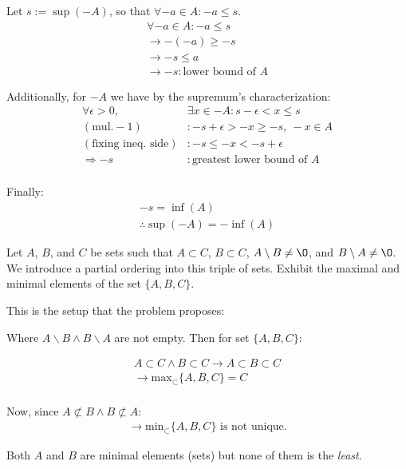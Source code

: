 \begin{solution}
Let $s := \sup{(-A)}$, so that $\forall -a \in A: -a \leq s$.
\begin{align*}
\forall -a \in A: -a \leq s \\
\rightarrow -(-a) \geq -s \\
\rightarrow -s \leq a \\
\rightarrow -s : \text{lower bound of } A
\end{align*}

Additionally, for $-A$ we have by the supremum's characterization:
\begin{align*}
\forall \epsilon > 0, &\exists x \in -A: s - \epsilon < x \leq s\\
(\text{mul.} -1)&: -s + \epsilon > -x \geq -s, \ -x \in A\\
(\text{fixing ineq. side})&: -s \leq -x < -s + \epsilon \\
\Rightarrow -s&: \text{greatest lower bound of } A \\
\end{align*}

Finally:
\begin{align*}
-s = \inf(A) \\
\therefore \sup(-A) = -\inf(A)
\end{align*}

\end{solution}

\begin{problem}
Let $A$, $B$, and $C$ be sets such that $A \subset C$, $B \subset C$, $A \setminus B \neq \O$, and $B \setminus A \neq \O$. We introduce a partial ordering into this triple of sets. Exhibit the maximal and minimal elements of the set $\{A,B,C\}$.
\end{problem}

\begin{solution}
This is the setup that the problem proposes:

Where $A \backslash B \land B \backslash A$ are not empty. Then for set $\{A, B, C\}$:

\begin{align*}
A \subset C \land B \subset C \rightarrow A \subset B \subset C \\
\rightarrow \text{max}_{\subset}\{A, B, C\} = C \\
\end{align*}

Now, since $A \not\subset B \land B \not\subset A$:
\begin{align*}
\rightarrow \text{min}_{\subset}\{A, B, C\} \text{ is not unique.}
\end{align*}

Both $A$ and $B$ are minimal elements (sets) but none of them is the \textit{least}.
\end{solution}

